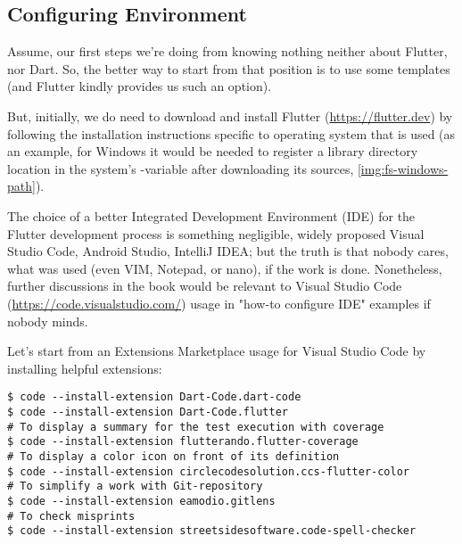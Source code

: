 
\subsection{Configuring Environment} \label{first-step}

Assume, our first steps we're doing from knowing nothing neither about Flutter, nor Dart. So, the better way to start 
from that position is to use some templates (and Flutter kindly provides us such an option).

But, initially, we do need to download and install Flutter (\href{https://flutter.dev}{https://flutter.dev}) by 
following the installation instructions specific to operating system that is used (as an example, for Windows it 
would be needed to register a library directory location in the system's -variable after downloading its 
sources, \cref{img:fs-windows-path}).


The choice of a better Integrated Development Environment (IDE) for the Flutter development process is something 
negligible, widely proposed Visual Studio Code, Android Studio, IntelliJ IDEA; but the truth is that nobody cares, 
what was used (even VIM, Notepad, or nano), if the work is done. Nonetheless, further discussions in the book would be 
relevant to Visual Studio Code (\href{https://code.visualstudio.com/}{https://code.visualstudio.com/}) usage in 
"how-to configure IDE" examples if nobody minds.

\noindent Let's start from an Extensions Marketplace usage for Visual Studio Code by installing helpful extensions:

\begin{lstlisting}[language=terminal]
$ code --install-extension Dart-Code.dart-code
$ code --install-extension Dart-Code.flutter
# To display a summary for the test execution with coverage
$ code --install-extension flutterando.flutter-coverage
# To display a color icon on front of its definition
$ code --install-extension circlecodesolution.ccs-flutter-color
# To simplify a work with Git-repository
$ code --install-extension eamodio.gitlens
# To check misprints
$ code --install-extension streetsidesoftware.code-spell-checker
\end{lstlisting}

